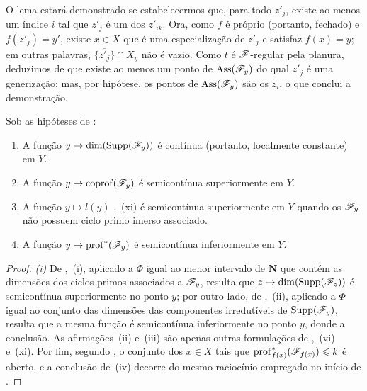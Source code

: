 \begin{env}[12.2.1.3]
O lema estará demonstrado se
estabelecermos que, para todo
$z'_j$, existe ao menos um
índice $i$ tal que $z'_j$
é um dos $z'_{ik}$. Ora,
como $f$ é próprio (portanto,
fechado) e $f(z'_j)=y'$,
existe $x\in X$ que é uma
especialização de $z'_j$ e
satisfaz $f(x)=y$; em outras
palavras,
$\overline{\{z'_j\}}\cap X_y$
não é vazio. Como $t$ é
$\mathscr{F}$-regular pela
planura, deduzimos de
 que existe
ao menos um ponto de
$\operatorname{Ass}(\mathscr{F}_y)$
do qual $z'_j$ é uma
generização; mas, por
hipótese, os pontos de
$\operatorname{Ass}(\mathscr{F}_y)$
são os $z_i$, o que conclui
a demonstração.
\end{env}

\begin{corollary}[12.2.2]
\label{IV.12.2.2}
Sob as hipóteses de
:
\begin{enumerate}[label=(\roman*)]
\item A função
$y\mapsto\dim(\operatorname{Supp}(\sh{F}_y))$
é contínua (portanto, localmente
constante) em $Y$.
\item A função
$y\mapsto\operatorname{coprof}(\sh{F}_y)$
 é semicontínua
superiormente em $Y$.
\item A função $y\mapsto l(y)$
,~(xi) é
semicontínua superiormente em
$Y$ quando os $\mathscr{F}_y$ não
possuem ciclo primo imerso
associado.
\item A função
$y\mapsto\operatorname{prof}^{*}(\sh{F}_y)$
 é semicontínua
inferiormente em $Y$.
\end{enumerate}
\end{corollary}

\begin{proof}
\emph{(i)} De ,~(i),
aplicado a $\Phi$ igual ao menor
intervalo de $\mathbf{N}$ que
contém as dimensões dos ciclos
primos associados a $\mathscr{F}_y$,
resulta que
$z\mapsto\dim(\operatorname{Supp}(\sh{F}_z))$
é semicontínua superiormente no
ponto $y$; por outro lado, de
,~(ii), aplicado
a $\Phi$ igual ao conjunto das
dimensões das componentes
irredutíveis de
$\operatorname{Supp}(\mathscr{F}_y)$,
resulta que a mesma função é
semicontínua inferiormente no
ponto $y$, donde a conclusão.
As afirmações~(ii) e~(iii)
são apenas outras formulações
de ,~(vi)
e~(xi). Por fim, segundo
, o conjunto
dos $x\in X$ tais que
$\operatorname{prof}_{f(x)}^{*}
(\mathscr{F}_{f(x)})\leqslant k$ é aberto,
e a conclusão de~(iv) decorre
do mesmo raciocínio empregado
no início de .
\end{proof}

